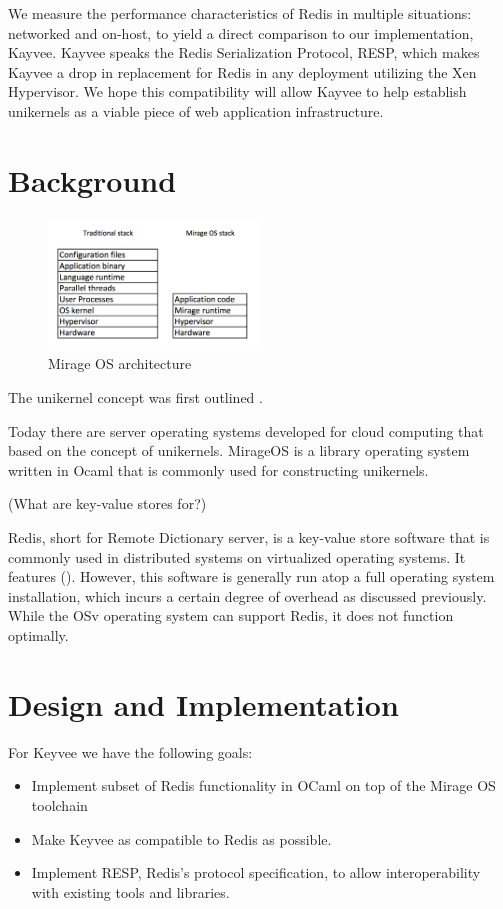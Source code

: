 \documentclass[english,10pt,twocolumn]{article}
\begin{document}
We measure the performance characteristics of Redis in multiple situations: networked and on-host, to yield a direct comparison to our implementation, Kayvee.
Kayvee speaks the Redis Serialization Protocol\cite{redis-protocol}, RESP, which makes Kayvee a drop in replacement for Redis in any deployment utilizing the Xen Hypervisor.
We hope this compatibility will allow Kayvee to help establish unikernels as a viable piece of web application infrastructure.


\section{Background}

\begin{figure}[ht]
  \centering
  \caption{Mirage OS architecture}
  \includegraphics[width=0.5\textwidth]{images/design}
\end{figure}

The unikernel concept was first outlined .

Today there are server operating systems developed for cloud computing that based on the concept of unikernels. MirageOS is a library operating system written in Ocaml that is commonly used for constructing unikernels.

(What are key-value stores for?) 

Redis, short for Remote Dictionary server, is a key-value store software that is commonly used in distributed systems on virtualized operating systems. It features (). However, this software is generally run atop a full operating system installation, which incurs a certain degree of overhead as discussed previously.  While the OSv operating system can support Redis, it does not function optimally.


\section{Design and Implementation}

For Keyvee we have the following goals:
\begin{itemize}
  \item Implement subset of Redis functionality in OCaml on top of the Mirage OS toolchain
  \item Make Keyvee as compatible to Redis as possible.
  \item Implement RESP, Redis's protocol specification, to allow interoperability with existing tools and libraries.
\end{itemize}
\end{document}
